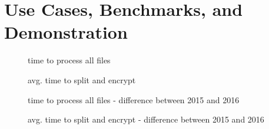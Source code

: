 \chapter{Use Cases, Benchmarks, and Demonstration}

\begin{figure}[h]
\centering

\caption{time to process all files}
\end{figure}

\begin{figure}[h]
\centering

\caption{avg. time to split and encrypt}
\end{figure}

\begin{figure}[h]
\centering

\caption{time to process all files - difference between 2015 and 2016}
\end{figure}

\begin{figure}[h]
\centering

\caption{avg. time to split and encrypt - difference between 2015 and 2016}
\end{figure}